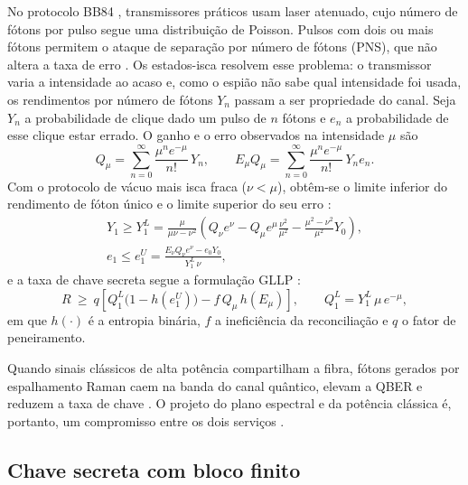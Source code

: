\documentclass[12pt]{article}
\begin{document}
No protocolo BB84 \cite{bennett1984}, transmissores práticos usam laser
atenuado, cujo número de fótons por pulso segue uma distribuição de Poisson.
Pulsos com dois ou mais fótons permitem o ataque de separação por número de
fótons (PNS), que não altera a taxa de erro \cite{brassard2000}. Os
estados-isca \cite{hwang2003,lo2005,ma2005} resolvem esse problema: o
transmissor varia a intensidade ao acaso e, como o espião não sabe qual
intensidade foi usada, os rendimentos por número de fótons $Y_n$ passam a ser
propriedade do canal. Seja $Y_n$ a probabilidade de clique dado um pulso de $n$
fótons e $e_n$ a probabilidade de esse clique estar errado. O ganho e o erro
observados na intensidade $\mu$ são
\begin{equation}
Q_\mu=\sum_{n=0}^{\infty}\frac{\mu^n e^{-\mu}}{n!}\,Y_n,\qquad
E_\mu Q_\mu=\sum_{n=0}^{\infty}\frac{\mu^n e^{-\mu}}{n!}\,Y_n e_n .
\label{eq:ganho}
\end{equation}
Com o protocolo de vácuo mais isca fraca ($\nu<\mu$), obtêm-se o limite
inferior do rendimento de fóton único e o limite superior do seu erro
\cite{ma2005}:
\begin{gather}
Y_1\ge Y_1^L=\frac{\mu}{\mu\nu-\nu^2}\left(Q_\nu e^{\nu}-Q_\mu e^{\mu}\frac{\nu^2}{\mu^2}-\frac{\mu^2-\nu^2}{\mu^2}Y_0\right),\nonumber\\
e_1\le e_1^U=\frac{E_\nu Q_\nu e^{\nu}-e_0Y_0}{Y_1^L\,\nu},
\label{eq:isca}
\end{gather}
e a taxa de chave secreta segue a formulação GLLP \cite{gottesman2004}:
\begin{equation}
R\ \ge\ q\left[Q_1^L\bigl(1-h(e_1^U)\bigr)-f\,Q_\mu\,h(E_\mu)\right],\qquad Q_1^L=Y_1^L\,\mu\,e^{-\mu},
\label{eq:gllp}
\end{equation}
em que $h(\cdot)$ é a entropia binária, $f$ a ineficiência da reconciliação e
$q$ o fator de peneiramento.

Quando sinais clássicos de alta potência compartilham a fibra, fótons gerados
por espalhamento Raman caem na banda do canal quântico, elevam a QBER e reduzem
a taxa de chave \cite{eraerds2010,patel2012,kumar2015}. O projeto do plano
espectral e da potência clássica é, portanto, um compromisso entre os dois
serviços \cite{thomas2023}.

\subsection{Chave secreta com bloco finito}
\label{sec:finita}
\end{document}
